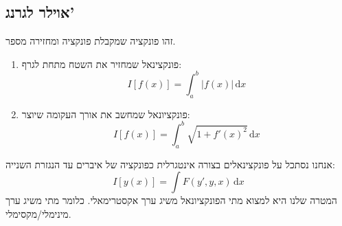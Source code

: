 \documentclass{tstextbook}
\begin{document}
\subsection{אוילר לגרנג'}

\begin{definition}[פונקציונאל]
זהו פונקציה שמקבלת פונקציה ומחזירה מספר. 

\end{definition}
\begin{example}
  \begin{enumerate}
    \item פונקצינאל שמחזיר את השטח מתחת לגרף: 
$$I[f(x)]=\int_{a}^b |f(x)| \, \mathrm{d}x $$


    \item פונקציונאל שמחשב את אורך העקומה שיוצר: 
$$I[f(x)]=\int_{a}^b \sqrt{ 1+f'(x)^2 } \, \mathrm{d}x $$


  \end{enumerate}
\end{example}
אנחנו נסתכל על פונקצינאלים בצורה אינטגרלית כפונקציה של איברים עד הנגזרת השנייה:
$$I[y(x)]=\int F(y',y,x) \, \mathrm{d}x $$
המטרה שלנו היא למצוא מתי הפונקציונאל משיג ערך אקסטרימאלי. כלומר מתי משיג ערך מינימלי/מקסימלי. 
\end{document}
